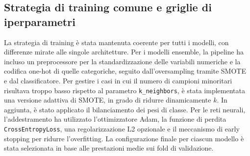 \documentclass[a4paper,12pt]{report}
\begin{document}
	\subsection{Strategia di training comune e griglie di iperparametri}
	La strategia di training è stata mantenuta coerente per tutti i modelli, con differenze mirate alle singole architetture. Per i modelli ensemble, la pipeline ha incluso un preprocessore per la standardizzazione delle variabili numeriche e la codifica one-hot di quelle categoriche, seguito dall’oversampling tramite SMOTE e dal classificatore. Per gestire i casi in cui il numero di campioni minoritari risultava troppo basso rispetto al parametro \texttt{k\_neighbors}, è stata implementata una versione adattiva di SMOTE, in grado di ridurre dinamicamente $k$. In aggiunta, è stato applicato il bilanciamento dei pesi di classe. Per le reti neurali, l’addestramento ha utilizzato l’ottimizzatore Adam, la funzione di perdita \texttt{CrossEntropyLoss}, una regolarizzazione L2 opzionale e il meccanismo di early stopping per ridurre l’overfitting. La configurazione finale per ciascun modello è stata selezionata in base alle prestazioni medie sui fold di validazione. \cite{chawla2011smote} \\
	
\end{document}
